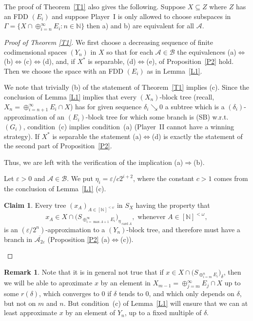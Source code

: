 \documentclass[11pt,leqno]{amsart}
\theoremstyle{definition}
\newtheorem*{remark}{Remark}
\newtheorem*{claim}{Claim}
\newcommand{\ds}{\displaystyle}
\newcommand{\vp}{\varepsilon}
\newcommand{\card}{\operatorname{card}}
\newcommand{\cA}{\mathcal{A}}
\newcommand{\cB}{\mathcal{B}}
\newcommand{\N}{\mathbb{N}}
\newcommand{\fN}{[\N]^{<\omega}}
\begin{document}
The proof of Theorem~\ref{T1} also gives the following. 
Suppose $X\subseteq Z$ where $Z$ has an FDD $(E_i)$ and suppose Player~I 
is only allowed to choose subspaces in $\Gamma = \{X\cap \oplus_{i=n}^\infty 
E_i:n \in \N\}$ then a) and b) are equivalent for all $\cA$. 
  
\begin{proof}[Proof of Theorem \ref{T1}]

We first choose a decreasing sequence of finite codimensional spaces 
$(Y_n)$ in $X$  so that for each $\cA\in\cB$ the equivalences 
(a)$\iff$(b)$\iff$(c)$\iff$(d), and, if $X^*$ is separable, (d)$\iff$(e),
of Proposition~\ref{P2} hold. 
Then we choose the space with an FDD $(E_i)$ as in Lemma~\ref{L1}.

We note  that trivially (b) of the statement of Theorem~\ref{T1} implies (c). 
Since the conclusion of Lemma \ref{L1} implies
that every $(X_n)$-block tree (recall, $X_n = \oplus_{i=n+1}^\infty 
E_i\cap X$) has for given sequence 
$\delta_i\searrow 0$ a subtree which  is
a $(\delta_i)$-approximation of an $(E_i)$-block tree for which some 
branch is (SB) w.r.t. $(G_i)$, 
condition~(c) implies condition~(a) (Player~II cannot have a winning 
strategy). 
If $X^*$ is separable the statement (a)$\iff$(d) is exactly the statement of 
the second part of Proposition~\ref{P2}.

Thus, we are left with the verification of the implication (a)$\Rightarrow$(b).

Let $\vp>0$ and $\cA\in\cB$. We put $\eta_i=\vp/c2^{i+2}$, where the 
constant $c>1$ comes from the conclusion of Lemma~\ref{L1} (c).

\begin{claim}
Every tree $(x_A)_{A\in\fN}$ 
in $S_X$ having the property that
\begin{equation}\label{E17}
x_A\in X\cap \bigl(S_{\ds\oplus_{i=\max A+1}^\infty E_i}
\bigr)_{\eta_{\card A}},\text{ whenever }A\in\fN,
\end{equation}
is an $(\vp/2^n)$-approximation to a $(Y_n)$-block tree, and therefore 
must have a branch in $\overline{\cA_{2\vp}}$ 
(Proposition \ref{P2} (a)$\iff$(c)).
\end{claim}
\renewcommand{\qedsymbol}{\ }
\end{proof}

\begin{remark} 
Note that it is in general  not true that if 
$x\in X\cap \bigl(S_{\ds\oplus_{i=m}^n E_i}\bigr)_{\delta}$, then 
we will be able to aproximate $x$ by an element in $X_{m-1}=
 \oplus_{j=m}^\infty E_j\cap X$ up to some 
$r(\delta)$, which converges to $0$
if $\delta$ tends to 0, and which only depends on $\delta$,
but not on $m$ and $n$. But condition~(c) of Lemma~\ref{L1} 
will ensure that we can at least approximate
$x$ by an element of $Y_n$, up to a fixed multiple of $\delta$.
\end{remark}
\end{document}
